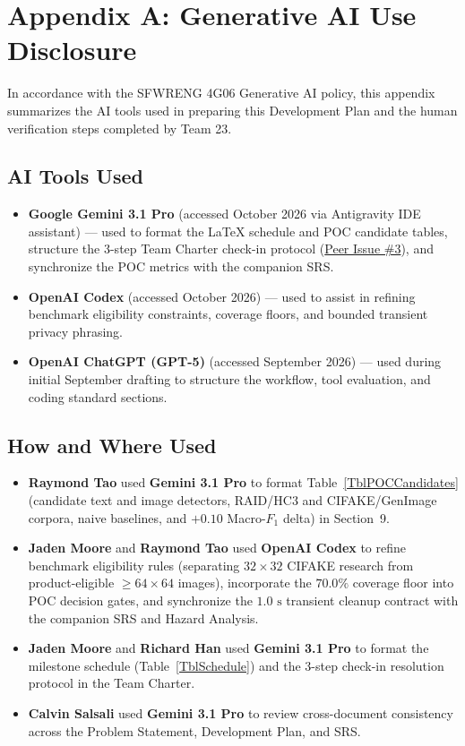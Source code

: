 \documentclass{article}
\begin{document}
\newpage{}
\section*{Appendix A: Generative AI Use Disclosure}

In accordance with the SFWRENG 4G06 Generative AI policy, this appendix summarizes the AI tools used in preparing this Development Plan and the human verification steps completed by Team 23.

\subsection*{AI Tools Used}
\begin{itemize}[leftmargin=*]
    \item \textbf{Google Gemini 3.1 Pro} (accessed October 2026 via Antigravity IDE assistant) --- used to format the \LaTeX{} schedule and POC candidate tables, structure the 3-step Team Charter check-in protocol (\href{https://github.com/richy1337/Verity/issues/3}{Peer Issue \#3}), and synchronize the POC metrics with the companion SRS.
    \item \textbf{OpenAI Codex} (accessed October 2026) --- used to assist in refining benchmark eligibility constraints, coverage floors, and bounded transient privacy phrasing.
    \item \textbf{OpenAI ChatGPT (GPT-5)} (accessed September 2026) --- used during initial September drafting to structure the workflow, tool evaluation, and coding standard sections.
\end{itemize}

\subsection*{How and Where Used}
\begin{itemize}[leftmargin=*]
    \item \textbf{Raymond Tao} used \textbf{Gemini 3.1 Pro} to format Table~\ref{TblPOCCandidates} (candidate text and image detectors, RAID/\allowbreak{}HC3 and CIFAKE/\allowbreak{}GenImage corpora, naive baselines, and $+0.10$ Macro-$F_1$ delta) in Section~9.
    \item \textbf{Jaden Moore} and \textbf{Raymond Tao} used \textbf{OpenAI Codex} to refine benchmark eligibility rules (separating $32\times32$ CIFAKE research from product-eligible $\ge 64\times64$ images), incorporate the $70.0\%$ coverage floor into POC decision gates, and synchronize the $1.0\text{ s}$ transient cleanup contract with the companion SRS and Hazard Analysis.
    \item \textbf{Jaden Moore} and \textbf{Richard Han} used \textbf{Gemini 3.1 Pro} to format the milestone schedule (Table~\ref{TblSchedule}) and the 3-step check-in resolution protocol in the Team Charter.
    \item \textbf{Calvin Salsali} used \textbf{Gemini 3.1 Pro} to review cross-document consistency across the Problem Statement, Development Plan, and SRS.
\end{itemize}
\end{document}
